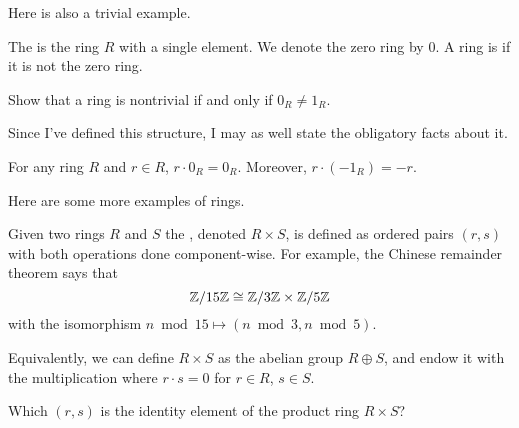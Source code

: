 Here is also a trivial example.
\begin{definition}
	The  is the ring $R$ with a single element.
	We denote the zero ring by $0$.
	A ring is  if it is not the zero ring.
\end{definition}
\begin{exercise}
	[Comedic]
	Show that a ring is nontrivial if and only if $0_R \neq 1_R$.
\end{exercise}

Since I've defined this structure, I may as well state the obligatory facts about it.
\begin{fact}
	For any ring $R$ and $r \in R$, $r \cdot 0_R = 0_R$.
	Moreover, $r \cdot (-1_R) = -r$.
\end{fact}

Here are some more examples of rings.
\begin{example}
	\label{ex:product_ring}
	Given two rings $R$ and $S$ the ,
	denoted $R \times S$, is defined as ordered pairs $(r,s)$
	with both operations done component-wise.
	For example, the Chinese remainder theorem says
	that \[ \mathbb Z/15\mathbb Z \cong \mathbb Z/3\mathbb Z \times \mathbb Z/5\mathbb Z \]
	with the isomorphism $n \bmod{15} \mapsto (n \bmod 3, n \bmod 5)$.
\end{example}
\begin{remark}
	Equivalently, we can define $R \times S$ as the abelian group $R \oplus S$,
	and endow it with the multiplication where $r \cdot s = 0$
	for $r \in R$, $s \in S$.
\end{remark}
\begin{ques}
	Which $(r,s)$ is the identity element of the product ring $R \times S$?
\end{ques}

